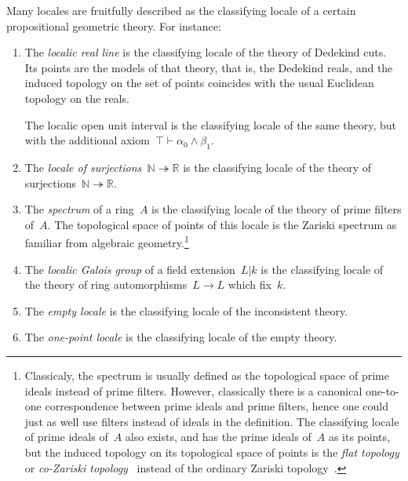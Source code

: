 \documentclass{ws-rv9x6}
\newcommand{\NN}{\mathbb{N}}
\newcommand{\RR}{\mathbb{R}}
\renewcommand{\_}{\mathpunct{.}}
\newcommand{\?}{\,{:}\,}
\begin{document}
Many locales are fruitfully described as the classifying locale of a certain
propositional geometric theory. For instance:
\begin{enumerate}
\item The \emph{localic real line} is the classifying locale of the theory of
Dedekind cuts. Its points are the models of that theory, that is, the Dedekind
reals, and the induced topology on the set of points coincides with the usual
Euclidean topology on the reals.

The localic open unit interval is the classifying locale of the
same theory, but with the additional axiom~$\top \vdash \alpha_0 \wedge \beta_1$.
\item The \emph{locale of surjections~$\NN \twoheadrightarrow \RR$} is the
classifying locale of the theory of surjections~$\NN \twoheadrightarrow \RR$.
\item The \emph{spectrum} of a ring~$A$ is the classifying locale of the
theory of prime filters of~$A$. The topological space of points of this locale
is the Zariski spectrum as familiar from algebraic
geometry.\footnote{Classicaly, the spectrum is usually defined as the
topological space of prime ideals instead of prime filters. However,
classically there is a canonical one-to-one correspondence between prime ideals
and prime filters, hence one could just as well use filters instead of ideals
in the definition. The classifying locale of prime ideals of~$A$ also exists,
and has the prime ideals of~$A$ as its points, but the induced topology on its
topological space of points is the \emph{flat topology} or \emph{co-Zariski
topology}~\cite{tarizadeh:flat} instead of the ordinary
Zariski topology~\cite[Proposition~4.5]{johnstone:rings-fields-and-spectra}.}
\item The \emph{localic Galois group} of a field extension~$L|k$ is the
classifying locale of the theory of ring automorphisms~$L \to L$ which fix~$k$.
\item The \emph{empty locale} is the classifying locale of the inconsistent theory.
\item The \emph{one-point locale} is the classifying locale of the empty theory.
\end{enumerate}
\end{document}
